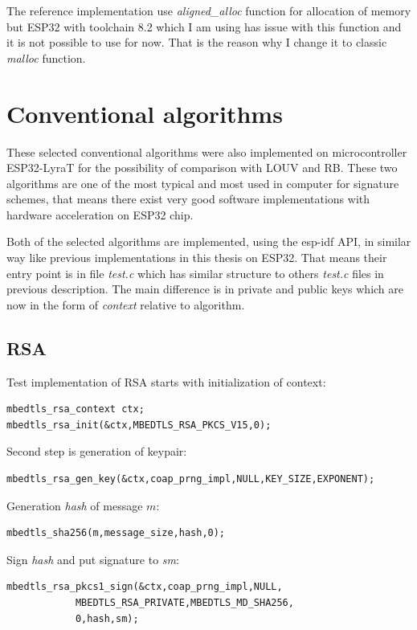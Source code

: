\documentclass[thesis=M,english]{FITthesis}[2019/12/23]
\begin{document}
\bigskip
\noindent
The reference implementation use \textit{aligned\_alloc} function for allocation of memory but ESP32 with toolchain 8.2 which I am using has issue with this function and it is not possible to use for now. That is the reason why I change it to classic \textit{malloc} function.

\newpage
\section{Conventional algorithms}
These selected conventional algorithms were also implemented on microcontroller ESP32-LyraT for the possibility of comparison with LOUV and RB. These two algorithms are one of the most typical and most used in computer for signature schemes, that means there exist very good software implementations with hardware acceleration on ESP32 chip. 

\bigskip
\noindent
Both of the selected algorithms are implemented, using the esp-idf API, in similar way like previous implementations in this thesis on ESP32. That means their entry point is in file \textit{test.c} which has similar structure to others \textit{test.c} files in previous description. The main difference is in private and public keys which are now in the form of \textit{context} relative to algorithm.

\subsection{RSA}
Test implementation of RSA starts with initialization of context:
\begin{lstlisting}[frame=single]
mbedtls_rsa_context ctx;
mbedtls_rsa_init(&ctx,MBEDTLS_RSA_PKCS_V15,0);
\end{lstlisting}

\noindent
Second step is generation of keypair:
\begin{lstlisting}[frame=single]
mbedtls_rsa_gen_key(&ctx,coap_prng_impl,NULL,KEY_SIZE,EXPONENT);
\end{lstlisting}

\noindent
Generation \textit{hash} of message $m$:
\begin{lstlisting}[frame=single]
mbedtls_sha256(m,message_size,hash,0);
\end{lstlisting}

\noindent
Sign \textit{hash} and put signature to \textit{sm}:
\begin{lstlisting}[frame=single]
mbedtls_rsa_pkcs1_sign(&ctx,coap_prng_impl,NULL,
			MBEDTLS_RSA_PRIVATE,MBEDTLS_MD_SHA256,
			0,hash,sm);
\end{lstlisting}
\end{document}
